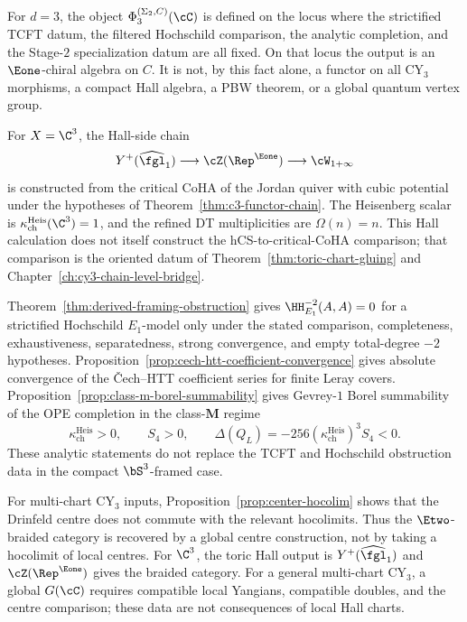 For \(d=3\), the object
\(\Phi_3^{(\Sigma_2,C)}(\cC)\) is defined on the locus where the
strictified TCFT datum, the filtered Hochschild comparison, the
analytic completion, and the Stage-\(2\) specialization datum are all
fixed.  On that locus the output is an \(\Eone\)-chiral algebra on
\(C\).  It is not, by this fact alone, a functor on all CY\(_3\)
morphisms, a compact Hall algebra, a PBW theorem, or a global quantum
vertex group.

For \(X=\C^3\), the Hall-side chain
\[
Y^+(\widehat{\fgl}_1)\longrightarrow
\cZ(\Rep^{\Eone})\longrightarrow \cW_{1+\infty}
\]
is constructed from the critical CoHA of the Jordan quiver with cubic
potential under the hypotheses of Theorem~\ref{thm:c3-functor-chain}.
The Heisenberg scalar is
\(\kappa_{\mathrm{ch}}^{\mathrm{Heis}}(\C^3)=1\), and the refined DT
multiplicities are \(\Omega(n)=n\).  This Hall calculation does not
itself construct the hCS-to-critical-CoHA comparison; that comparison
is the oriented datum of Theorem~\ref{thm:toric-chart-gluing} and
Chapter~\ref{ch:cy3-chain-level-bridge}.

Theorem~\ref{thm:derived-framing-obstruction} gives
\(\HH^{-2}_{E_1}(A,A)=0\) for a strictified Hochschild \(E_1\)-model
only under the stated comparison, completeness, exhaustiveness,
separatedness, strong convergence, and empty total-degree \(-2\)
hypotheses.  Proposition~\ref{prop:cech-htt-coefficient-convergence}
gives absolute convergence of the \v{C}ech--HTT coefficient series for
finite Leray covers.  Proposition~\ref{prop:class-m-borel-summability}
gives Gevrey-\(1\) Borel summability of the OPE completion in the
class-\(\mathbf M\) regime
\[
\kappa_{\mathrm{ch}}^{\mathrm{Heis}}>0,\qquad
S_4>0,\qquad
\Delta(Q_L)=-256(\kappa_{\mathrm{ch}}^{\mathrm{Heis}})^3S_4<0.
\]
These analytic statements do not replace the TCFT and Hochschild
obstruction data in the compact \(\bS^3\)-framed case.

For multi-chart CY\(_3\) inputs, Proposition~\ref{prop:center-hocolim}
shows that the Drinfeld centre does not commute with the relevant
hocolimits.  Thus the \(\Etwo\)-braided category is recovered by a
global centre construction, not by taking a hocolimit of local
centres.  For \(\C^3\), the toric Hall output is
\(Y^+(\widehat{\fgl}_1)\) and \(\cZ(\Rep^{\Eone})\) gives the braided
category.  For a general multi-chart CY\(_3\), a global
\(G(\cC)\) requires compatible local Yangians, compatible doubles, and
the centre comparison; these data are not consequences of local Hall
charts.

